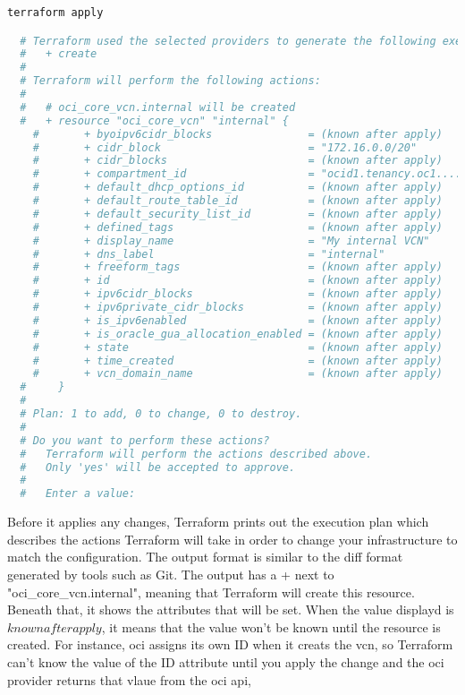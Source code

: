 \documentclass[../main.tex]{subfiles}
\begin{document}
\begin{lstlisting}[language=bash]
  terraform apply

  # Terraform used the selected providers to generate the following execution plan. Resource actions are indicated with the following symbols:
  #   + create
  # 
  # Terraform will perform the following actions:
  # 
  #   # oci_core_vcn.internal will be created
  #   + resource "oci_core_vcn" "internal" {
    #       + byoipv6cidr_blocks               = (known after apply)
    #       + cidr_block                       = "172.16.0.0/20"
    #       + cidr_blocks                      = (known after apply)
    #       + compartment_id                   = "ocid1.tenancy.oc1...."
    #       + default_dhcp_options_id          = (known after apply)
    #       + default_route_table_id           = (known after apply)
    #       + default_security_list_id         = (known after apply)
    #       + defined_tags                     = (known after apply)
    #       + display_name                     = "My internal VCN"
    #       + dns_label                        = "internal"
    #       + freeform_tags                    = (known after apply)
    #       + id                               = (known after apply)
    #       + ipv6cidr_blocks                  = (known after apply)
    #       + ipv6private_cidr_blocks          = (known after apply)
    #       + is_ipv6enabled                   = (known after apply)
    #       + is_oracle_gua_allocation_enabled = (known after apply)
    #       + state                            = (known after apply)
    #       + time_created                     = (known after apply)
    #       + vcn_domain_name                  = (known after apply)
  #     }
  # 
  # Plan: 1 to add, 0 to change, 0 to destroy.
  # 
  # Do you want to perform these actions?
  #   Terraform will perform the actions described above.
  #   Only 'yes' will be accepted to approve.
  # 
  #   Enter a value:
\end{lstlisting}

Before it applies any changes, Terraform prints out the execution plan which describes the actions Terraform will take in order to change your infrastructure to match the configuration.
The output format is similar to the diff format generated by tools such as Git.
The output has a + next to "oci\_core\_vcn.internal", meaning that Terraform will create this resource. Beneath that, it shows the attributes that will be set.
When the value displayd is \(known after apply\), it means that the value won't be known until the resource is created.
For instance, \acrshort{oci} assigns its own ID when it creats the \acrshort{vcn}, so Terraform can't know the value of the ID attribute until you apply the change and the \acrshort{oci} provider returns that vlaue from the \acrshort{oci} \acrfull{api},
\end{document}
